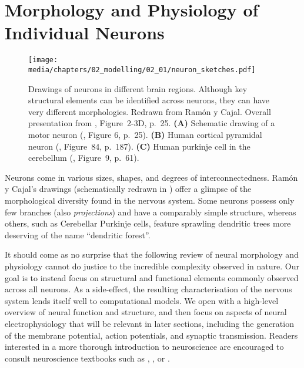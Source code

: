
\section{Morphology and Physiology of Individual Neurons}
\label{sec:neurophysiology}

\begin{figure}
	\centering
	{\label{fig:neuron_sketches_motor}}%
	{\label{fig:neuron_sketches_pyramidal}}%
	{\label{fig:neuron_sketches_purkinje}}%
	\texttt{[image: media/chapters/02\_modelling/02\_01/neuron\_sketches.pdf]}
	\caption[Drawings of neurons in different brain regions]{Drawings of neurons in different brain regions.
	Although key structural elements can be identified across neurons, they can have very different morphologies.
	Redrawn from Ramón y Cajal.
	Overall presentation from \citet{kandel2012principles}, Figure~2-3D, p.~25.
	\textbf{(A)} Schematic drawing of a motor neuron (\cite{ramonycajal1894nouvelles}, Figure 6, p.~25).
	\textbf{(B)} Human cortical pyramidal neuron (\cite{howell1916textbook}, Figure~84, p.~187).
	\textbf{(C)} Human purkinje cell in the cerebellum (\cite{ramonycajal1909histologie}, Figure~9, p.~61).
	\label{fig:neuron_sketches}
	}
\end{figure}

Neurons come in various sizes, shapes, and degrees of interconnectedness.
Ramón y Cajal's drawings (schematically redrawn in ) offer a glimpse of the morphological diversity found in the nervous system.
Some neurons possess only few branches (also \emph{projections}) and have a comparably simple structure, whereas others, such as Cerebellar Purkinje cells, feature sprawling dendritic trees more deserving of the name \enquote{dendritic forest}.

It should come as no surprise that the following review of neural morphology and physiology cannot do justice to the incredible complexity observed in nature.
Our goal is to instead focus on structural and functional elements commonly observed across all neurons.
As a side-effect, the resulting characterisation of the nervous system lends itself well to computational models.
We open with a high-level overview of neural function and structure, and then focus on aspects of neural electrophysiology that will be relevant in later sections, including the generation of the membrane potential, action potentials, and synaptic transmission.
Readers interested in a more thorough introduction to neuroscience are encouraged to consult neuroscience textbooks such as \citet{bear2016neuroscience}, \citet{purves2017neuroscience}, or \citet{kandel2012principles}.

